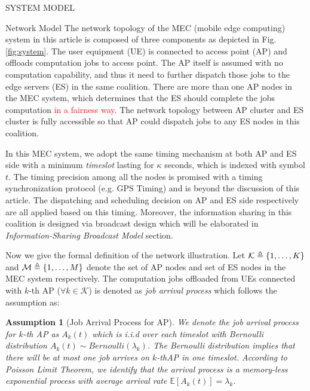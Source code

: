 \documentclass[10pt, conference, letterpaper]{IEEEtran}
\newtheorem{assumption}{Assumption}
\newcommand{\define}{\triangleq}
\DeclarePairedDelimiter{\set}{\{}{\}}
\newcommand{\apSet}{\mathcal{K}}
\begin{document}
    \begin{section}{SYSTEM MODEL}
        \label{sec:model}
        \begin{subsection}{Network Model}
            The network topology of the MEC (mobile edge computing) system in this article is composed of three components as depicted in Fig. \ref{fig:system}.
            The user equipment (UE) is connected to access point (AP) and offloads computation jobs to access point. The AP itself is assumed with no computation capability, and thus it need to further dispatch those jobs to the edge servers (ES) in the same coalition. There are more than one AP nodes in the MEC system, which determines that the ES should complete the jobs computation \textcolor{red}{in a fairness way}. The network topology between AP cluster and ES cluster is fully accessible so that AP could dispatch jobs to any ES nodes in this coalition.

            In this MEC system, we adopt the same timing mechanism at both AP and ES side with a minimum \emph{timeslot} lasting for $\kappa$ seconds, which is indexed with symbol $t$. The timing precision among all the nodes is promised with a timing synchronization protocol (e.g. GPS Timing) and is beyond the discussion of this article. The dispatching and scheduling decision on AP and ES side respectively are all applied based on this timing. Moreover, the information sharing in this coalition is designed via broadcast design which will be elaborated in \emph{Information-Sharing Broadcast Model} section.

            Now we give the formal definition of the network illustration. Let $\apSet \define \set{1,\dots,K}$ and $\mathcal{M} \define \set{1,\dots,M}$ denote the set of AP nodes and set of ES nodes in the MEC system respectively. The computation jobs offloaded from UEs connected with $k$-th AP ($\forall k\in\apSet$) is denoted as \emph{job arrival process} which follows the assumption as:
            \begin{assumption}[Job Arrival Process for AP]
                We denote the job arrival process for $k$-th AP as $A_k(t)$ which is i.i.d over each timeslot with Bernoulli distribution $A_k(t) \sim Bernoulli(\lambda_k)$. The Bernoulli distribution implies that there will be at most one job arrives on $k$-thAP in one timeslot. According to Poisson Limit Theorem, we identify that the arrival process is a memory-less exponential process with average arrival rate $\mathbb{E}[A_k(t)] = \lambda_k$.
            \end{assumption}
            

\end{subsection}
\end{section}
\end{document}
